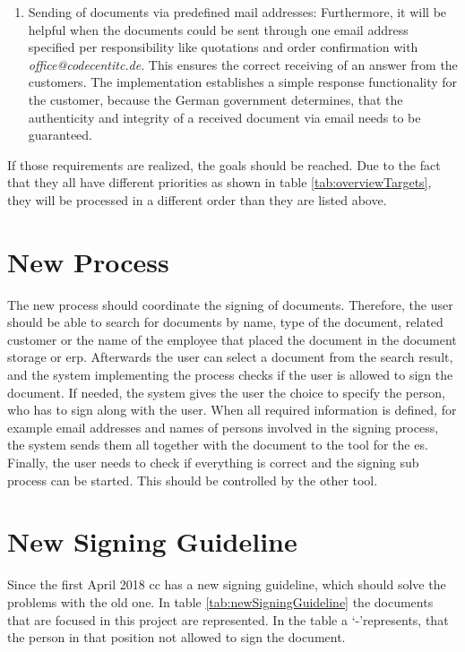 \begin{enumerate}
	\item Sending of documents via predefined mail addresses: \newline
	Furthermore, it will be helpful when the documents could be sent through one email address specified per responsibility like quotations and order confirmation with \textit{office@codecentitc.de}. This ensures the correct receiving of an answer from the customers. The implementation establishes a simple response functionality for the customer, because the German government determines, that the authenticity and integrity of a received document via email needs to be guaranteed.
\end{enumerate}
If those requirements are realized, the goals should be reached. Due to the fact that they all have different priorities as shown in table \ref{tab:overviewTargets}, they will be processed in a different order than they are listed above.

\section{New Process}
The new process should coordinate the signing of documents. Therefore, the user should be able to search for documents by name, type of the document, related customer or the name of the employee that placed the document in the document storage or \gls{erp}. Afterwards the user can select a document from the search result, and the system implementing the process checks if the user is allowed to sign the document. If needed, the system gives the user the choice to specify the person, who has to sign along with the user. When all required information is defined, for example email addresses and names of persons involved in the signing process, the system sends them all together with the document to the tool for the \gls{es}. Finally, the user needs to check if everything is correct and the signing sub process can be started. This should be controlled by the other tool. 

\section{New Signing Guideline}
Since the first April 2018 \gls{cc} has a new signing guideline, which should solve the problems with the old one. In table \ref{tab:newSigningGuideline} the documents that are focused in this project are represented. 
In the table a `-'represents, that the person in that position not allowed to sign the document.

